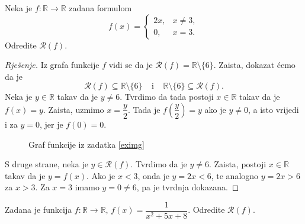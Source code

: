 \begin{exercise}
\label{eximg}
Neka je $f : \mathbb{R}\to \mathbb{R}$ zadana formulom
$$f(x)=\begin{cases}
2x, & x\neq 3, \\
0, & x=3.
   \end{cases}$$
Odredite $\mathcal{R}(f)$.
\end{exercise}
\begin{proof}[Rješenje]
Iz grafa funkcije $f$ vidi se da je $\mathcal{R}(f)=\mathbb{R}\setminus \{6\}$. Zaista, dokazat ćemo da je $$\mathcal{R}(f)\subseteq \mathbb{R}\setminus \{6\}\;\;\;\;\text{i}\;\;\;\;\mathbb{R}\setminus \{6\}\subseteq \mathcal{R}(f).$$
Neka je $y\in \mathbb{R}$ takav da je $y\neq 6$. Tvrdimo da tada postoji $x\in \mathbb{R}$ takav da je $f(x)=y$. Zaista, uzmimo $x=\dfrac{y}{2}$. Tada je $f\left(\dfrac{y}{2}\right)=y$ ako je $y\neq 0$, a isto vrijedi i za $y=0$, jer je $f(0)=0$.
\begin{figure}[ht]
\begin{center}
\end{center}
\caption{\label{exim1} Graf funkcije iz zadatka \ref{eximg}}
\end{figure}

S druge strane, neka je $y\in \mathcal{R}(f)$. Tvrdimo da je $y\neq 6$. Zaista, postoji $x\in \mathbb{R}$ takav da je $y=f(x)$. Ako je $x<3$, onda je $y=2x<6$, te analogno $y=2x>6$ za $x>3$. Za $x=3$ imamo $y=0\neq 6$, pa je tvrdnja dokazana.
\end{proof}
\newpage
\begin{exercise}
\label{eximg2}
Zadana je funkcija $f : \mathbb{R}\to \mathbb{R}$, $f(x)=\dfrac{1}{x^2+5x+8}$. Odredite $\mathcal{R}(f)$.
\end{exercise}
